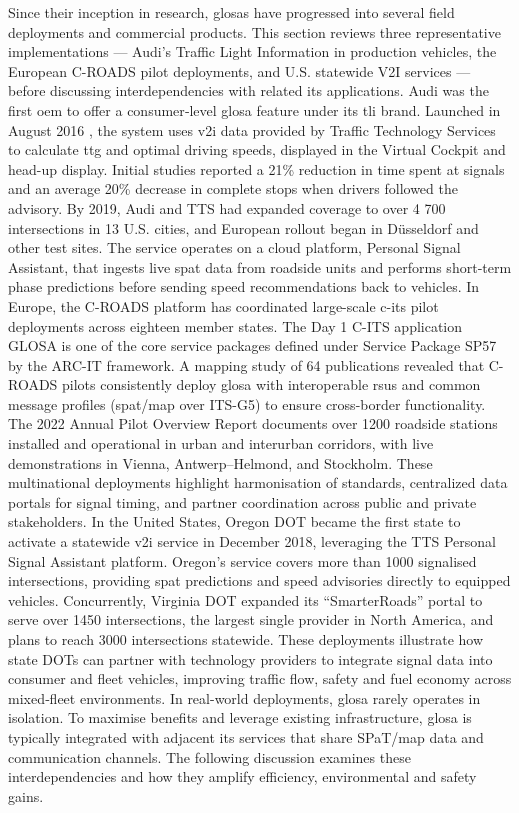 Since their inception in research, \acp{glosa} have progressed into several field deployments and commercial products. This section reviews three representative implementations --- Audi’s Traffic Light Information in production vehicles, the European C-ROADS pilot deployments, and U.S. statewide V2I services --- before discussing interdependencies with related \ac{its} applications.
\mynewline
Audi was the first \ac{oem} to offer a consumer‐level \ac{glosa} feature under its \ac{tli} brand. Launched in August 2016 \cite{AudiV2I2016}, the system uses \ac{v2i} data provided by Traffic Technology Services to calculate \ac{ttg} and optimal driving speeds, displayed in the Virtual Cockpit and head-up display. Initial studies reported a 21\% reduction in time spent at signals and an average 20\% decrease in complete stops when drivers followed the advisory. \cite{AudiTechTalk} By 2019, Audi and TTS had expanded coverage to over 4 700 intersections in 13 U.S. cities, and European rollout began in Düsseldorf and other test sites. The service operates on a cloud platform, Personal Signal Assistant, that ingests live \ac{spat} data from roadside units and performs short‐term phase predictions before sending speed recommendations back to vehicles. \cite{TTS2019}
In Europe, the C-ROADS platform has coordinated large-scale \ac{c-its} pilot deployments across eighteen member states. The Day 1 C-ITS application GLOSA is one of the core service packages defined under Service Package SP57 by the ARC-IT framework. \cite{ARCITSP57} A mapping study of 64 publications revealed that C-ROADS pilots consistently deploy \ac{glosa} with interoperable \acp{rsu} and common message profiles (\ac{spat}/\ac{map} over ITS-G5) to ensure cross-border functionality. \cite{Mellegard2020} The 2022 Annual Pilot Overview Report documents over 1200 roadside stations installed and operational in urban and interurban corridors, with live demonstrations in Vienna, Antwerp–Helmond, and Stockholm. \cite{CROADSPilot2022} These multinational deployments highlight harmonisation of standards, centralized data portals for signal timing, and partner coordination across public and private stakeholders.
In the United States, Oregon DOT became the first state to activate a statewide \ac{v2i} service in December 2018, leveraging the TTS Personal Signal Assistant platform. Oregon’s service covers more than 1000 signalised intersections, providing \ac{spat} predictions and speed advisories directly to equipped vehicles. Concurrently, Virginia DOT expanded its “SmarterRoads” portal to serve over 1450 intersections, the largest single provider in North America, and plans to reach 3000 intersections statewide. \cite{TTS2019} These deployments illustrate how state DOTs can partner with technology providers to integrate signal data into consumer and fleet vehicles, improving traffic flow, safety and fuel economy across mixed‐fleet environments.
\mynewline
In real-world deployments, \ac{glosa} rarely operates in isolation. To maximise benefits and leverage existing infrastructure, \ac{glosa} is typically integrated with adjacent \ac{its} services that share SPaT/\ac{map} data and communication channels. The following discussion examines these interdependencies and how they amplify efficiency, environmental and safety gains.

